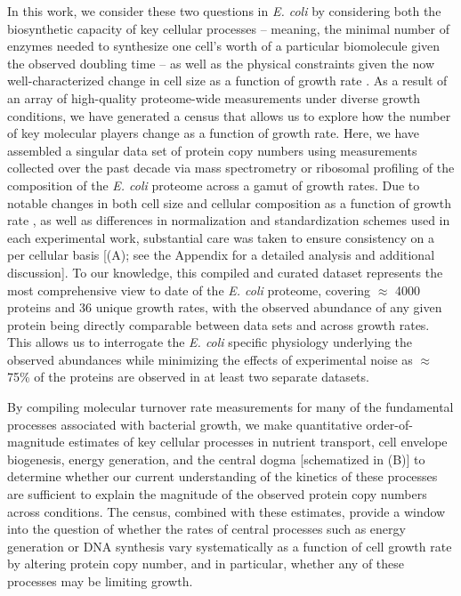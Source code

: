 In this work, we consider these two questions in \textit{E. coli} by considering
both the biosynthetic capacity of key cellular processes --  meaning, the minimal
number of enzymes needed to synthesize one cell's worth of a particular biomolecule
given the observed doubling time --  as well as the physical constraints given the now
well-characterized change in cell size as a function of growth rate
\citep{taheriaraghi2015, si2017, basan2015}. As a result of an array of
high-quality proteome-wide measurements under diverse growth conditions, we have
generated a census that allows us to explore how the number of key molecular
players change as a function of growth rate. Here, we have assembled a singular
data set of protein copy numbers using measurements collected over the past
decade via mass spectrometry \citep{schmidt2016, peebo2015, valgepea2013} or
ribosomal profiling \citep{li2014} of the composition of the \textit{E. coli}
proteome across a gamut of growth rates. Due to notable changes in both cell
size and cellular composition as a function of growth rate \citep{bremer2008,
taheriaraghi2015}, as well as differences in normalization and standardization
schemes used in each experimental work, substantial care was taken to ensure
consistency on a per cellular basis [(A); see the Appendix for a detailed analysis
and additional discussion]. To our knowledge, this compiled and curated dataset
represents the most comprehensive view to date of the \textit{E. coli} proteome,
covering $\approx$ 4000 proteins and 36 unique growth rates, with the observed
abundance of any given protein being directly comparable between data sets and
across growth rates. This allows us to interrogate the \textit{E. coli} specific
physiology underlying the observed abundances while minimizing the effects of
experimental noise as $\approx$ 75\% of the  proteins are observed in at least
two separate datasets.

By compiling molecular turnover rate measurements for many of the
fundamental processes associated with bacterial growth, we make quantitative
order-of-magnitude estimates of key cellular processes in nutrient transport,
cell envelope biogenesis, energy generation, and the central dogma [schematized
in (B)] to determine whether our current understanding of the
kinetics of these processes are sufficient to explain the magnitude of the
observed protein copy numbers across conditions. The census, combined with these
estimates, provide a window into the question of whether the rates of central
processes such as energy generation or DNA synthesis vary systematically as a
function of cell growth rate by altering protein copy number, and in particular,
whether any of these processes may be limiting growth.

